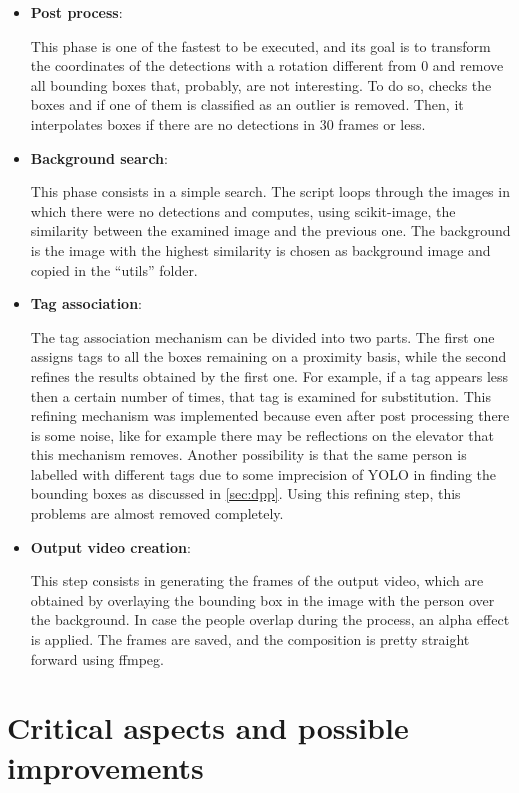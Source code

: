 \documentclass[conference]{IEEEtran}
\begin{document}
\begin{itemize}
			\item \textbf{Post process}:
			
				This phase is one of the fastest to be executed, and its goal is to transform the coordinates of the detections with a rotation different from 
				0 and remove all bounding boxes that, probably, are not interesting. To do so, checks the boxes and if one of them is classified as an outlier 
				is removed. Then, it interpolates boxes if there are no detections in 30 frames or less.
			
			\item \textbf{Background search}:
			
				This phase consists in a simple search. The script loops through the images in which there were no detections and computes, using scikit-image,
				the similarity between the examined image and the previous one. The background is the image with the highest similarity is chosen as background 
				image and copied in the ``utils'' folder.
			
			\item \textbf{Tag association}:
				
				The tag association mechanism can be divided into two parts. The first one assigns tags to all the boxes remaining on a proximity basis, while 
				the second refines the results obtained by the first one. For example, if a tag appears less then a certain number of times, that tag is 
				examined for substitution. This refining mechanism was implemented because even after post processing there is some noise, like for example there 
				may be reflections on the elevator that this mechanism removes. Another possibility is that the same person is labelled with different tags due to 
				some imprecision of YOLO in finding the bounding boxes as discussed in \ref{sec:dpp}. Using this refining step, this problems are almost removed 
				completely. 
			
			\item \textbf{Output video creation}:
			
				This step consists in generating the frames of the output video, which are obtained by overlaying the bounding box in the image with the person 
				over the background. In case the people overlap during the process, an alpha effect is applied. The frames are saved, and the composition is 
				pretty straight forward using ffmpeg.
			
			
		\end{itemize}

	\section{Critical aspects and possible improvements}
	
\end{document}
